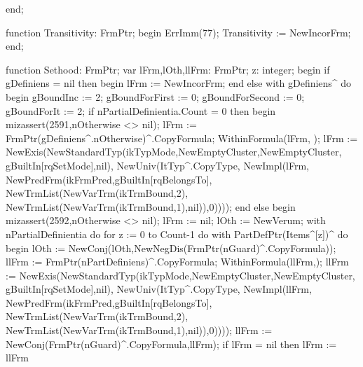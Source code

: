    end;
   
   function Transitivity: FrmPtr;
   begin
      ErrImm(77);
      Transitivity := NewIncorFrm;
   end;
   
   function Sethood: FrmPtr;
   var
      lFrm,lOth,llFrm: FrmPtr;
      z: integer;
   begin
      if gDefiniens = nil then
      begin
         lFrm := NewIncorFrm;
      end
      else
         with gDefiniens^ do
      begin
         gBoundInc := 2;
         gBoundForFirst := 0; gBoundForSecond := 0;
         gBoundForIt := 2;
         if nPartialDefinientia.Count = 0 then
         begin
            mizassert(2591,nOtherwise <> nil);
            lFrm := FrmPtr(gDefiniens^.nOtherwise)^.CopyFormula;
            WithinFormula(lFrm, );
            lFrm := NewExis(NewStandardTyp(ikTypMode,NewEmptyCluster,NewEmptyCluster,
                                           gBuiltIn[rqSetMode],nil),
                            NewUniv(ItTyp^.CopyType,
                                    NewImpl(lFrm,
                                            NewPredFrm(ikFrmPred,gBuiltIn[rqBelongsTo],
                                                       NewTrmList(NewVarTrm(ikTrmBound,2),
                                                                  NewTrmList(NewVarTrm(ikTrmBound,1),nil)),0))));
         end
         else
         begin
            mizassert(2592,nOtherwise <> nil);
            lFrm := nil; lOth := NewVerum;
            with nPartialDefinientia do
               for z := 0 to Count-1 do
                  with PartDefPtr(Items^[z])^ do
               begin
                  lOth := NewConj(lOth,NewNegDis(FrmPtr(nGuard)^.CopyFormula));
                  llFrm := FrmPtr(nPartDefiniens)^.CopyFormula;
                  WithinFormula(llFrm,);
                  llFrm := NewExis(NewStandardTyp(ikTypMode,NewEmptyCluster,NewEmptyCluster,
                                                  gBuiltIn[rqSetMode],nil),
                                   NewUniv(ItTyp^.CopyType,
                                           NewImpl(llFrm,
                                                   NewPredFrm(ikFrmPred,gBuiltIn[rqBelongsTo],
                                                              NewTrmList(NewVarTrm(ikTrmBound,2),
                                                                         NewTrmList(NewVarTrm(ikTrmBound,1),nil)),0))));
                  llFrm := NewConj(FrmPtr(nGuard)^.CopyFormula,llFrm);
                  if lFrm = nil
                  then lFrm := llFrm
